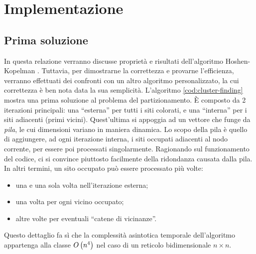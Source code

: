\section{Implementazione}
\label{sec:implementazione}

\subsection{Prima soluzione}

In questa relazione verranno discusse proprietà e risultati 
dell'algoritmo Hoshen-Kopelman \cite{Hoshen-Kopelman}.
Tuttavia, per dimostrarne la correttezza e provarne l'efficienza,
verranno effettuati dei confronti con un altro algoritmo personalizzato,
la cui correttezza è ben nota data la sua semplicità.
L'algoritmo \ref{cod:cluster-finding} mostra una prima soluzione 
al problema del partizionamento. È composto da 2 iterazioni principali: 
una ``esterna'' per tutti i siti colorati, e una ``interna'' per i siti 
adiacenti (primi vicini). Quest'ultima si appoggia ad un vettore che 
funge da \textit{pila}, le cui dimensioni variano in maniera dinamica.
Lo scopo della pila è quello di aggiungere, ad ogni iterazione interna, 
i siti occupati adiacenti al nodo corrente, per essere poi processati
singolarmente.
Ragionando sul funzionamento del codice, ci si convince piuttosto 
facilmente della ridondanza causata dalla pila. In altri termini,
un sito occupato può essere processato più volte:
\begin{itemize}
    \item una e una sola volta nell'iterazione esterna;
    \item una volta per ogni vicino occupato;
    \item altre volte per eventuali ``catene di vicinanze''.
\end{itemize}

Questo dettaglio fa sì che la complessità asintotica temporale \cite{sipser} 
dell'algoritmo appartenga alla classe $O\left({n^4}\right)$ nel caso di un reticolo 
bidimensionale $n \times n$. 

